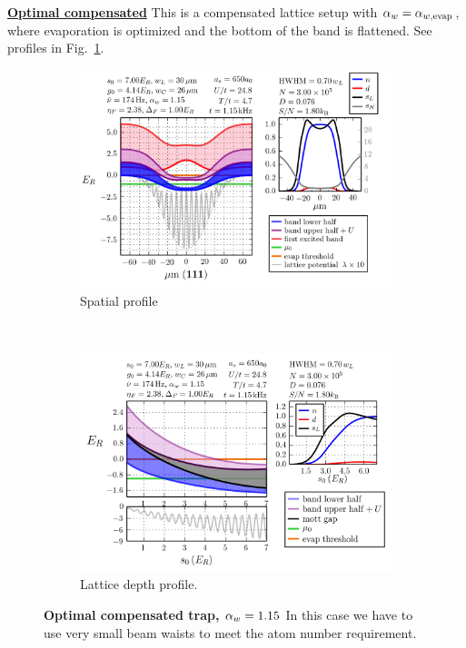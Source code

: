 \vspace{-2em}
\begin{myblock} 
  \underline{ \textbf{Optimal compensated}} \newline  This is a compensated
lattice setup with $ \alpha_{w}  =  \alpha_{w,\text{evap}} $, where evaporation is optimized and
the bottom of the band is flattened. See profiles in Fig.~\ref{fig:compare01}.
\end{myblock}
\begin{figure}
        \centering
        \begin{subfigure}[t]{0.49\textwidth}
		\includegraphics[width=\textwidth]{../figures/lda_evap/figures_hubbard-lda/Flat/007.png}
\caption{Spatial profile }
        \end{subfigure}%
        ~~ %
        \begin{subfigure}[t]{0.49\textwidth}
		\includegraphics[width=\textwidth]{../figures/lda_evap/figures_hubbard-lda/Flat/Mathy/007.png}
\caption{Lattice depth profile.}
        \end{subfigure}
	\caption{
\textbf{Optimal compensated trap, $ \alpha_{w}  = 1.15$} 
In this case we have to use very small beam waists to meet the atom number
requirement.  
 }
\label{fig:compare01}
\end{figure}
 
